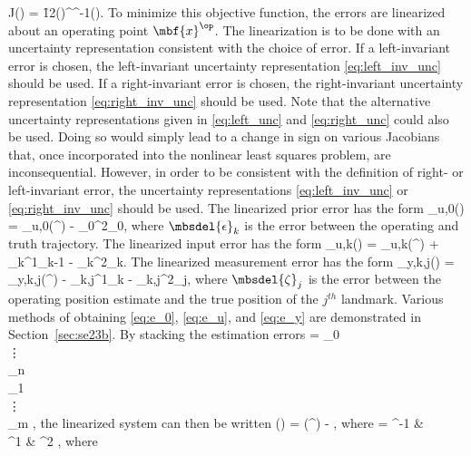 \bdis
	J() = \f{1}{2}()^\trans{}^{-1}().
\edis
To minimize this objective function, the errors are linearized about an operating point $\mbf{x}^\op$. The linearization is to be done with an uncertainty representation consistent with the choice of error. If a left-invariant error is chosen, the left-invariant uncertainty representation \eqref{eq:left_inv_unc} should be used. If a right-invariant error is chosen, the right-invariant uncertainty representation \eqref{eq:right_inv_unc} should be used. Note that the alternative uncertainty representations given in \eqref{eq:left_unc} and \eqref{eq:right_unc} could also be used. Doing so would simply lead to a change in sign on various Jacobians that, once incorporated into the nonlinear least squares problem, are inconsequential. However, in order to be consistent with the definition of right- or left-invariant error, the uncertainty representations \eqref{eq:left_inv_unc} or \eqref{eq:right_inv_unc} should be used. The linearized prior error has the form
\beq
	_{u,0}() = _{u,0}(^\op) - _0^2\mbsdel{\epsilon}_{0}, \label{eq:e_0}
\eeq
where $\mbsdel{\epsilon}_k$ is the error between the operating and truth trajectory.
The linearized input error has the form
\beq
	_{u,k}() = _{u,k}(^\op) + _k^1\mbsdel{\epsilon}_{k-1} - _k^2\mbsdel{\epsilon}_k. \label{eq:e_u}
\eeq
The linearized measurement error has the form
\beq
	_{y,k,j}() = _{y,k,j}(^\op) - _{k,j}^1\mbsdel{\epsilon}_{k} - _{k,j}^2\mbsdel{\zeta}_{j}, \label{eq:e_y}
\eeq
where $\mbsdel{\zeta}_{j}$ is the error  between the operating position estimate and the true position of the $j^{th}$ landmark. Various methods of obtaining \eqref{eq:e_0}, \eqref{eq:e_u}, and \eqref{eq:e_y} are demonstrated in Section~\ref{sec:se23b}. By stacking the estimation errors
\bdis
	 =
		\mbsdel{\epsilon}_0 \\
		\vdots \\
		\mbsdel{\epsilon}_n \\
		\hline
		\mbsdel{\zeta}_1 \\ 
		\vdots \\
		\mbsdel{\zeta}_m
	\ema,
\edis
the linearized system can then be written 
\bdis
	() = (^\op) - \mbs{\Gamma},
\edis
where
\bdis
	\mbs{\Gamma} = 
		^{-1} &  \\
		^1 & ^2
	\ema,
\edis
where 
